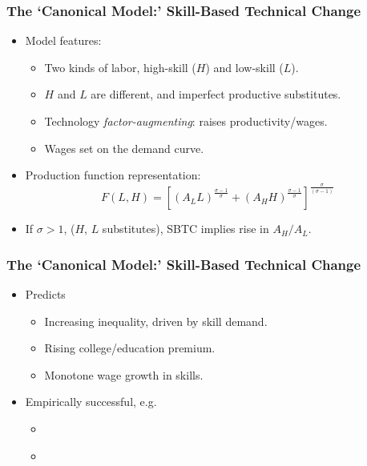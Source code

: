 \documentclass[red]{beamer}
\begin{document}
\begin{frame}
\frametitle{The `Canonical Model:' Skill-Based Technical Change}
\begin{itemize}
\item Model features:
\begin{itemize}
\item Two kinds of labor, high-skill ($H$) and low-skill ($L$).
\item $H$ and $L$ are different, and imperfect productive substitutes.
\item Technology \emph{factor-augmenting}: raises productivity/wages.
\item Wages set on the demand curve.
\end{itemize}
\vspace{5mm}
\item Production function representation:
\begin{equation*}
  \label{eq:cobbdoug}
  F(L,H) = \left[\left(A_LL\right)^{\frac{\sigma - 1}{\sigma}}
            + \left(A_HH\right)^{\frac{\sigma - 1}{\sigma}}
          \right]^\frac{\sigma}{(\sigma-1)}
\end{equation*}
\vspace{5mm}
\item If $\sigma>1$, ($H$, $L$ substitutes), SBTC implies rise in $A_H/A_L$.
\end{itemize}
\end{frame}

\begin{frame}
\frametitle{The `Canonical Model:' Skill-Based Technical Change}
\begin{itemize}
\item Predicts
  \begin{itemize}
  \item Increasing inequality, driven by skill demand.
  \item Rising college/education premium.
  \item Monotone wage growth in skills.
  \end{itemize}
\vspace{1cm}
\item Empirically successful, e.g.
  \begin{itemize}
  \item \citet{Katz1992}
  \item \citet{Card2001}
  \end{itemize}
\end{itemize}
\end{frame}
\end{document}
